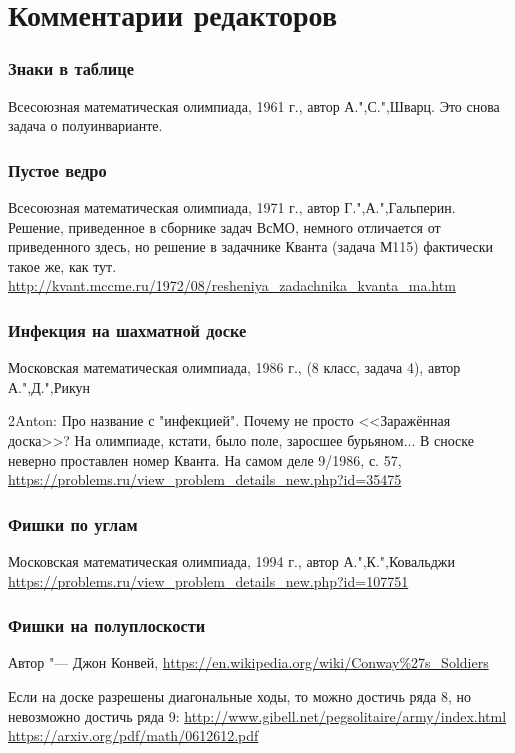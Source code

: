 \documentclass[twoside]{book}
\begin{document}
\section*{Комментарии редакторов}

\subsubsection*{Знаки в таблице}
Всесоюзная математическая олимпиада, 1961 г., автор А.",С.",Шварц. Это снова задача о полуинварианте.

\subsubsection{Пустое ведро}
Всесоюзная математическая олимпиада, 1971 г., автор  Г.",А.",Гальперин.
Решение, приведенное в сборнике задач ВсМО, немного отличается от приведенного здесь, но 
решение в задачнике Кванта (задача М115) фактически такое же, как тут.
\url{http://kvant.mccme.ru/1972/08/resheniya_zadachnika_kvanta_ma.htm} 


\subsubsection{Инфекция на шахматной доске}
Московская математическая олимпиада, 1986 г., (8 класс, задача 4), автор А.",Д.",Рикун

2Anton: Про название с "инфекцией". Почему не просто <<Заражённая доска>>? 
На олимпиаде, кстати, было поле, заросшее бурьяном... 
В сноске неверно проставлен номер Кванта. На самом деле 9/1986, с. 57,
\url{https://problems.ru/view_problem_details_new.php?id=35475}

\subsubsection{Фишки по углам}
Московская математическая олимпиада, 1994 г., автор  А.",К.",Ковальджи
\url{https://problems.ru/view_problem_details_new.php?id=107751}

\subsubsection{Фишки на полуплоскости}
Автор "--- Джон Конвей, \url{https://en.wikipedia.org/wiki/Conway%27s_Soldiers} 

Если на доске разрешены диагональные ходы, то можно достичь ряда 8, но невозможно достичь ряда 9:
\url{http://www.gibell.net/pegsolitaire/army/index.html https://arxiv.org/pdf/math/0612612.pdf}
\end{document}
